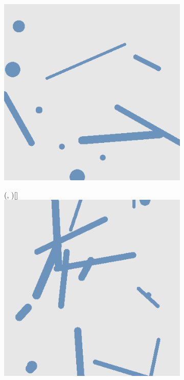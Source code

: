 \begin{figure}[H]
\begin{subfigure}{\w}
{            \includegraphics[width=\linewidth]{figures/generated-worlds/world_1.png}
        }
    \end{subfigure}
    \hspace*{\fill}
    \begin{subfigure}{\w}
        \makebox(\textwidth, \textwidth)[\textwidth]{
            \includegraphics[width=\linewidth]{figures/generated-worlds/world_2.png}
        }
    \end{subfigure}


\end{figure}

